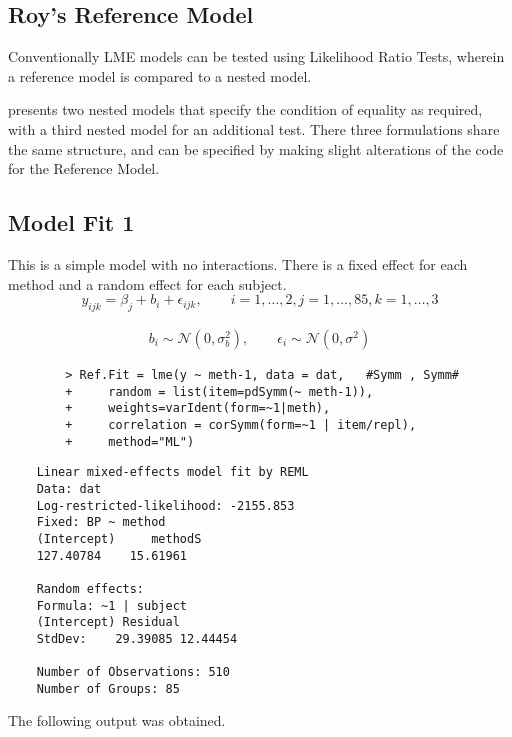 \documentclass[12pt, a4paper]{report}
\theoremstyle{plain}
\theoremstyle{definition}
\theoremstyle{remark}
\begin{document}
\subsection{Roy's Reference Model}
Conventionally LME models can be tested using Likelihood Ratio Tests, wherein a reference model is compared to a nested model.


\citet{ARoy2009} presents two nested models that specify the condition of equality as required, with a third nested model for an additional test. There three formulations share the same structure, and can be specified by making slight alterations of the code for the Reference Model.

\subsection{Model Fit 1}
	
	This is a simple model with no interactions. There is a fixed effect for each method and a random effect for each subject.
	\begin{equation*}
	y_{ijk} = \beta_{j}  + b_{i} + \epsilon_{ijk}, \qquad i=1,\dots,2, j=1,\dots,85, k=1,\dots,3
	\end{equation*}
	
	\begin{eqnarray*}
		b_{i} \sim \mathcal{N}(0,\sigma^2_{b}), \qquad \epsilon_{i} \sim \mathcal{N}(0,\sigma^2)
	\end{eqnarray*}
	\begin{framed}
		\begin{verbatim}
		> Ref.Fit = lme(y ~ meth-1, data = dat,   #Symm , Symm#
		+     random = list(item=pdSymm(~ meth-1)), 
		+     weights=varIdent(form=~1|meth),
		+     correlation = corSymm(form=~1 | item/repl), 
		+     method="ML")
		\end{verbatim}
	\end{framed}
		
	\begin{verbatim}
	Linear mixed-effects model fit by REML
	Data: dat
	Log-restricted-likelihood: -2155.853
	Fixed: BP ~ method
	(Intercept)     methodS
	127.40784    15.61961
	
	Random effects:
	Formula: ~1 | subject
	(Intercept) Residual
	StdDev:    29.39085 12.44454
	
	Number of Observations: 510
	Number of Groups: 85
	\end{verbatim}
	
	The following output was obtained.
\end{document}
